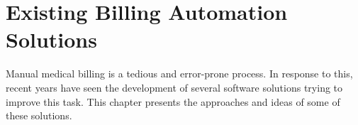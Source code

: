 \chapter{Existing Billing Automation Solutions}\label{ch:existing-billing-automation-solutions}

Manual medical billing is a tedious and error-prone process.
In response to this, recent years have seen the development of several software solutions trying to improve this task.
This chapter presents the approaches and ideas of some of these solutions.




